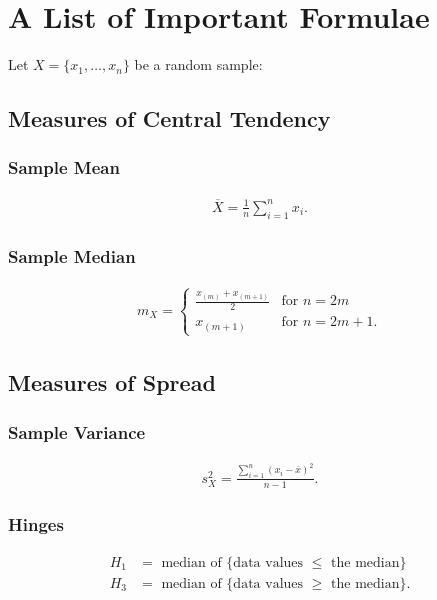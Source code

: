 \documentclass[a4paper, 12pt, twoside]{article}
\begin{document}
\newpage
\section{A List of Important Formulae}
Let $X = \{x_1, \ldots, x_n\}$ be a random sample:

\subsection{Measures of Central Tendency}

\subsubsection{Sample Mean}
\begin{gather*}
    \overline{X} = \frac{1}{n}\sum_{i = 1}^n x_i.
\end{gather*}

\subsubsection{Sample Median}
\begin{gather*}
    m_X = \begin{cases}
        \frac{x_{(m)} + x_{(m + 1)}}{2} & \text{for } n = 2m      \\
        x_{(m + 1)}                     & \text{for } n = 2m + 1.
    \end{cases}
\end{gather*}

\subsection{Measures of Spread}

\subsubsection{Sample Variance}
\begin{gather*}
    s_X^2 = \frac{\sum_{i = 1}^n (x_i - \overline{x})^2}{n - 1}.
\end{gather*}

\subsubsection{Hinges}
\begin{align*}
    H_1 & = \text{ median of \{data values } \leq \text{ the median\}}  \\
    H_3 & = \text{ median of \{data values } \geq \text{ the median\}}.
\end{align*}
\end{document}
